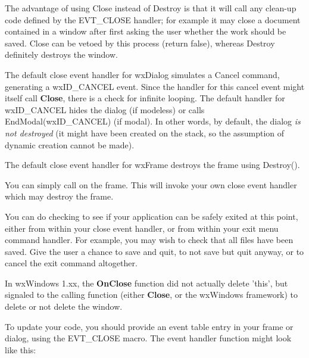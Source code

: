 The advantage of using Close instead of Destroy is that it will call any clean-up code
defined by the EVT\_CLOSE handler; for example it may close a document contained in
a window after first asking the user whether the work should be saved. Close can be vetoed
by this process (return false), whereas Destroy definitely destroys the window.


The default close event handler for wxDialog simulates a Cancel command,
generating a wxID\_CANCEL event. Since the handler for this cancel event might
itself call {\bf Close}, there is a check for infinite looping. The default handler
for wxID\_CANCEL hides the dialog (if modeless) or calls EndModal(wxID\_CANCEL) (if modal).
In other words, by default, the dialog {\it is not destroyed} (it might have been created
on the stack, so the assumption of dynamic creation cannot be made).

The default close event handler for wxFrame destroys the frame using Destroy().
%


You can simply call  on the frame. This
will invoke your own close event handler which may destroy the frame.

You can do checking to see if your application can be safely exited at this point,
either from within your close event handler, or from within your exit menu command
handler. For example, you may wish to check that all files have been saved.
Give the user a chance to save and quit, to not save but quit anyway, or to cancel
the exit command altogether.


In wxWindows 1.xx, the {\bf OnClose} function did not actually delete 'this', but signaled
to the calling function (either {\bf Close}, or the wxWindows framework) to delete
or not delete the window.

To update your code, you should provide an event table entry in your frame or
dialog, using the EVT\_CLOSE macro. The event handler function might look like this:

